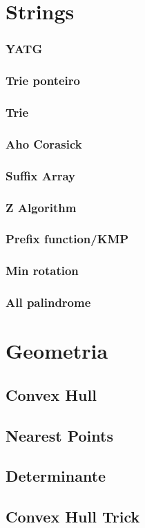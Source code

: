 \documentclass[a4paper,12pt]{article}
\newcommand\includes[4]{
   \subsection{#2}
   
}
\newcommand\includess[4]{
   \subsubsection{#2}
   
}
\begin{document}
\begin{multicols}{2}
\section{Strings}
\includess{c++}{YATG}{strings}{YATG.cpp}
\includess{c++}{Trie ponteiro}{strings}{trie_ponteiro.cpp}
\includess{c++}{Trie}{strings}{trieXor.cpp}
\includess{c++}{Aho Corasick}{strings}{aho-corasick.cpp}
\includess{c++}{Suffix Array}{strings}{suffix_array.cpp}
\includess{c++}{Z Algorithm}{strings}{z_algo.cpp}
\includess{c++}{Prefix function/KMP}{strings}{pf.cpp}
\includess{c++}{Min rotation}{strings}{min_rot.cpp}
\includess{c++}{All palindrome}{strings}{all_palindrome.cpp}

\section{Geometria}
\includes{c++}{Convex Hull}{geometria}{convexhull.cpp}
\includes{c++}{Nearest Points}{geometria}{near.cpp}
\includes{c++}{Determinante}{geometria}{det.cpp}
\includes{c++}{Convex Hull Trick}{adhoc}{cht.cpp}


\end{multicols}
\end{document}
